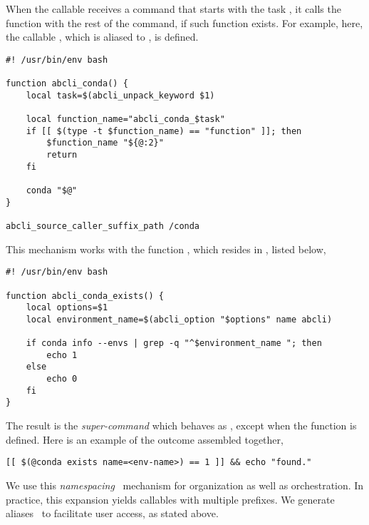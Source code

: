 When the callable  receives a command that starts with the task , it calls the function  with the rest of the command, if such function exists. For example, here, the callable , which is aliased to , is defined.

\begin{verbatim}
#! /usr/bin/env bash

function abcli_conda() {
    local task=$(abcli_unpack_keyword $1)

    local function_name="abcli_conda_$task"
    if [[ $(type -t $function_name) == "function" ]]; then
        $function_name "${@:2}"
        return
    fi

    conda "$@"
}

abcli_source_caller_suffix_path /conda
\end{verbatim}
%
This mechanism works with the function , which resides in , listed below,
%
\begin{verbatim}
#! /usr/bin/env bash

function abcli_conda_exists() {
    local options=$1
    local environment_name=$(abcli_option "$options" name abcli)

    if conda info --envs | grep -q "^$environment_name "; then
        echo 1
    else
        echo 0
    fi
}    
\end{verbatim}
%
The result is the \emph{super-command}  which behaves as , except when the function  is defined. Here is an example of the outcome assembled together,
%
\begin{verbatim}
[[ $(@conda exists name=<env-name>) == 1 ]] && echo "found."
\end{verbatim}
%
We use this \emph{namespacing}~\cite{namespaces} mechanism for organization as well as orchestration. In practice, this expansion yields callables with multiple prefixes. We generate  aliases~\cite{aliases} to facilitate user access, as stated above. 
